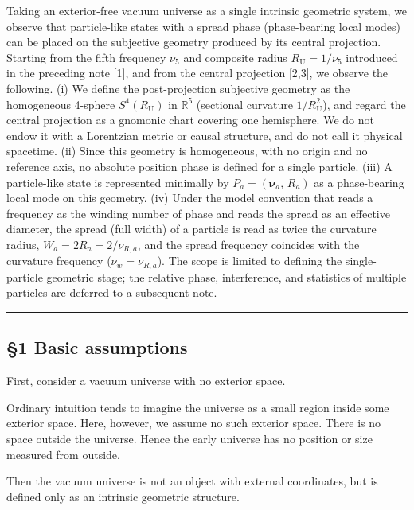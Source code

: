 \documentclass[
]{article}
\begin{document}
Taking an exterior-free vacuum universe as a single intrinsic geometric
system, we observe that particle-like states with a spread phase
(phase-bearing local modes) can be placed on the subjective geometry
produced by its central projection. Starting from the fifth frequency
\(\nu_5\) and composite radius \(R_{\mathrm U}=1/\nu_5\) introduced in
the preceding note {[}1{]}, and from the central projection {[}2,3{]},
we observe the following. (i) We define the post-projection subjective
geometry as the homogeneous 4-sphere \(S^4(R_{\mathrm U})\) in
\(\mathbb{R}^5\) (sectional curvature \(1/R_{\mathrm U}^2\)), and regard
the central projection as a gnomonic chart covering one hemisphere. We
do not endow it with a Lorentzian metric or causal structure, and do not
call it physical spacetime. (ii) Since this geometry is homogeneous,
with no origin and no reference axis, no absolute position phase is
defined for a single particle. (iii) A particle-like state is
represented minimally by \(P_a=(\boldsymbol{\nu}_a,\,R_a)\) as a
phase-bearing local mode on this geometry. (iv) Under the model
convention that reads a frequency as the winding number of phase and
reads the spread as an effective diameter, the spread (full width) of a
particle is read as twice the curvature radius,
\(W_a=2R_a=2/\nu_{R,a}\), and the spread frequency coincides with the
curvature frequency (\(\nu_w=\nu_{R,a}\)). The scope is limited to
defining the single-particle geometric stage; the relative phase,
interference, and statistics of multiple particles are deferred to a
subsequent note.

\begin{center}\rule{0.5\linewidth}{0.5pt}\end{center}

\subsection{§1 Basic assumptions}\label{basic-assumptions}

First, consider a vacuum universe with no exterior space.

Ordinary intuition tends to imagine the universe as a small region
inside some exterior space. Here, however, we assume no such exterior
space. There is no space outside the universe. Hence the early universe
has no position or size measured from outside.

Then the vacuum universe is not an object with external coordinates, but
is defined only as an intrinsic geometric structure.
\end{document}
